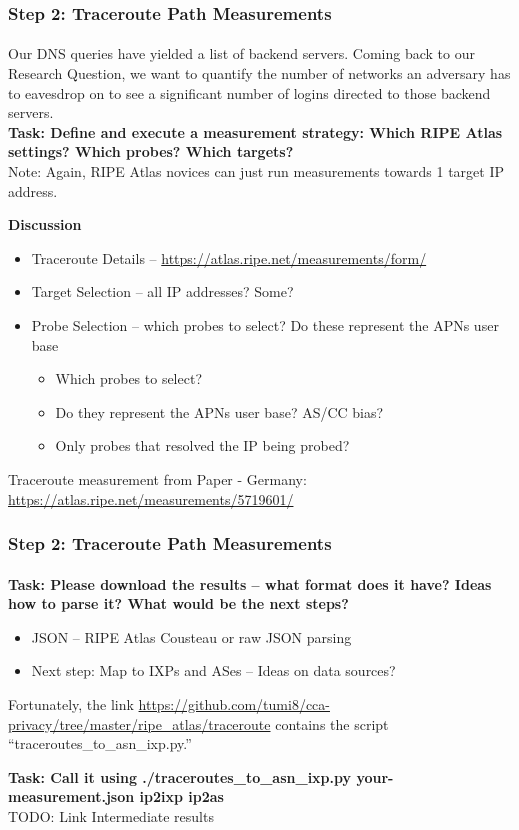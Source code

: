\begin{frame}
\frametitle{Step 2: Traceroute Path Measurements}
\framesubtitle{}
Our DNS queries have yielded a list of backend servers. Coming back to our Research Question, we want to quantify the number of networks an adversary has to eavesdrop on to see a significant number of logins directed to those backend servers. \\
\textbf{Task: Define and execute a measurement strategy: Which RIPE Atlas settings? Which probes? Which targets?}\\
Note: Again, RIPE Atlas novices can just run measurements towards 1 target IP address.

\pause
\textbf{Discussion}
\begin{itemize}
	\item Traceroute Details -- \url{https://atlas.ripe.net/measurements/form/}
	\item Target Selection -- all IP addresses? Some? 
	\item Probe Selection -- which probes to select? Do these represent the APNs user base
	\begin{itemize}
		\item Which probes to select?
		\item Do they represent the APNs user base? AS/CC bias?
		\item Only probes that resolved the IP being probed?
	\end{itemize}
\end{itemize}

Traceroute measurement from Paper - Germany: \url{https://atlas.ripe.net/measurements/5719601/}
\end{frame}
\clearpage
\begin{frame}
\frametitle{Step 2: Traceroute Path Measurements}
\framesubtitle{}
\textbf{Task: Please download the results -- what format does it have? Ideas how to parse it? What would be the next steps?}
\pause
\begin{itemize}
	\item JSON -- RIPE Atlas Cousteau or raw JSON parsing
	\item Next step: Map to IXPs and ASes -- Ideas on data sources?
\end{itemize}
\pause
Fortunately, the link \url{https://github.com/tumi8/cca-privacy/tree/master/ripe_atlas/traceroute} contains the script ``traceroutes\_to\_asn\_ixp.py.''

\textbf{Task: Call it using ./traceroutes\_to\_asn\_ixp.py your-measurement.json ip2ixp ip2as}\\
TODO: Link Intermediate results
\end{frame}
